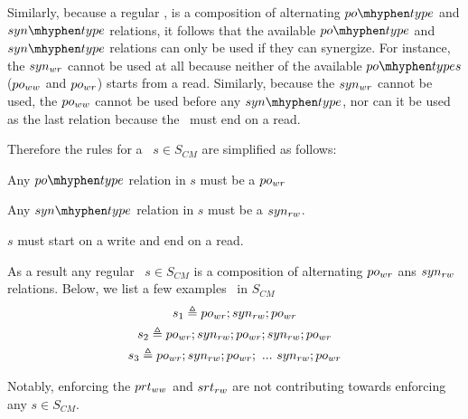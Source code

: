Similarly, because a regular \synpat, is a composition of alternating $\potype$ and $\syntype$ relations, it follows that the available $\potype$ and $\syntype$ relations can only be used if they can synergize. For instance, the $syn_{wr}$ cannot be used at all because neither of the available $\potypes$ ($po_{ww}$ and $po_{wr}$) starts from a read.
Similarly, because the $syn_{wr}$ cannot be used, the $po_{ww}$ cannot be used before any $\syntype$, nor can it be used as the last relation because the \synpat\ must end on a read. 

\custvspace
\noindent Therefore the rules for a \synpat\ $s \in S_{CM}$ are simplified as follows:
\squishlist
\item Any $\potype$ relation in $s$ must be a $po_{wr}$
\item Any $\syntype$ relation in $s$ must be a $syn_{rw}$. 
\item $s$ must start on a write and end on a read.
\squishend


As a result any regular  \synpat\ $s \in S_{CM}$ is a composition of alternating $po_{wr}$ ans $syn_{rw}$ relations. Below, we list a few examples \synpats\ in $S_{CM}$
\begin{gather*}
    s_{1} \triangleq po_{wr} ; syn_{rw}; po_{wr} \\
    s_{2} \triangleq po_{wr} ; syn_{rw}; po_{wr}; syn_{rw}; po_{wr}\\
    s_{3} \triangleq po_{wr} ; syn_{rw}; po_{wr};\ ...\ syn_{rw}; po_{wr}
\end{gather*}


Notably, enforcing the $prt_{ww}$ and $srt_{rw}$ are not contributing towards enforcing any $s \in S_{CM}$. 


